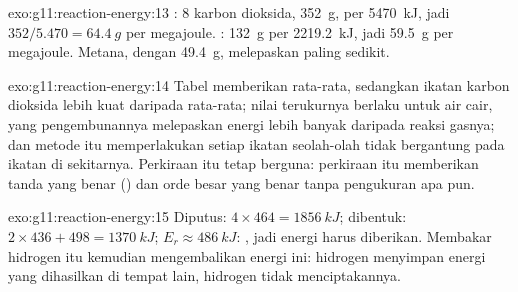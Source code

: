 \begin{solution}{exo:g11:reaction-energy:13}
: 8  karbon dioksida,
\qty{352}{g}, per \qty{5470}{kJ}, jadi $352 / 5.470 = \qty{64.4}{g}$ per
megajoule. : \qty{132}{g} per
\qty{2219.2}{kJ}, jadi \qty{59.5}{g} per megajoule. Metana, dengan
\qty{49.4}{g}, melepaskan paling sedikit.
\end{solution}

\begin{solution}{exo:g11:reaction-energy:14}
Tabel memberikan  rata-rata, sedangkan ikatan 
karbon dioksida lebih kuat daripada rata-rata; nilai terukurnya berlaku
untuk air cair, yang pengembunannya melepaskan energi lebih banyak
daripada reaksi gasnya; dan metode itu memperlakukan setiap ikatan
seolah-olah tidak bergantung pada ikatan di sekitarnya. Perkiraan itu
tetap berguna: perkiraan itu memberikan tanda yang benar () dan
orde besar yang benar tanpa pengukuran apa pun.
\end{solution}

\begin{solution}{exo:g11:reaction-energy:15}
Diputus: $4 \times 464 = \qty{1856}{kJ}$; dibentuk: $2 \times 436 + 498 =
\qty{1370}{kJ}$; $E_r \approx \qty{+486}{kJ}$: , jadi energi
harus diberikan. Membakar hidrogen itu kemudian mengembalikan energi
ini: hidrogen menyimpan energi yang dihasilkan di tempat lain, hidrogen
tidak menciptakannya.
\end{solution}

